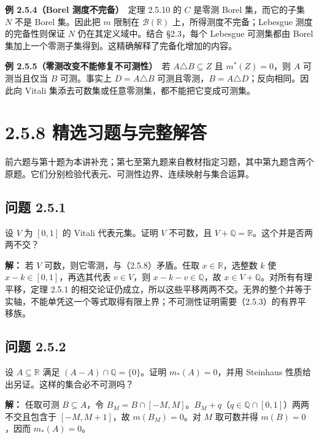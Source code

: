 \documentclass[11pt,a4paper]{article}
\begin{document}
\textbf{例 2.5.4（Borel 测度不完备）}　定理 2.5.10 的 \(C\) 是零测 Borel
集，而它的子集 \(N\) 不是 Borel 集。因此把 \(m\) 限制在
\(\mathcal B(\mathbb R)\) 上，所得测度不完备；Lebesgue
测度的完备性则保证 \(N\) 仍在其定义域中。结合 §2.3，每个 Lebesgue
可测集都由 Borel 集加上一个零测子集得到。这精确解释了完备化增加的内容。

\textbf{例 2.5.5（零测改变不能修复不可测性）}　若
\(A\triangle B\subseteq Z\) 且 \(m^*(Z)=0\)，则 \(A\) 可测当且仅当 \(B\)
可测。事实上 \(D=A\triangle B\)
可测且零测，\(B=A\triangle D\)；反向相同。因此向 Vitali
集添去可数集或任意零测集，都不能把它变成可测集。

\section[\S{}2.5.8
精选习题与完整解答]{2.5.8
精选习题与完整解答}\label{ux7cbeux9009ux4e60ux9898ux4e0eux5b8cux6574ux89e3ux7b54}

前六题与第十题为本讲补充；第七至第九题来自教材指定习题，其中第九题含两个原题。它们分别检验代表元、可测性边界、连续映射与集合运算。

\subsection{问题 2.5.1}\label{ux95eeux9898-2.5.1}

设 \(V\) 为 \([0,1]\) 的 Vitali 代表元集。证明 \(V\) 不可数，且
\(V+\mathbb Q=\mathbb R\)。这个并是否两两不交？

\textbf{解：} 若 \(V\) 可数，则它零测，与（2.5.8）矛盾。任取
\(x\in\mathbb R\)，选整数 \(k\) 使 \(x-k\in[0,1]\)，再选其代表
\(v\in V\)，则 \(x-k-v\in\mathbb Q\)，故
\(x\in V+\mathbb Q\)。对所有有理平移，定理 2.5.1
的相交论证仍成立，所以这些平移两两不交。无界的整个并等于实轴，不能单凭这一个等式取得有限上界；不可测性证明需要（2.5.3）的有界平移族。

\subsection{问题 2.5.2}\label{ux95eeux9898-2.5.2}

设 \(A\subseteq\mathbb R\) 满足 \((A-A)\cap\mathbb Q=\{0\}\)。证明
\(m_*(A)=0\)，并用 Steinhaus 性质给出另证。这样的集合必不可测吗？

\textbf{解：} 任取可测 \(B\subseteq A\)，令
\(B_M=B\cap[-M,M]\)。\(B_M+q\)（\(q\in\mathbb Q\cap[0,1]\)）两两不交且包含于
\([-M,M+1]\)，故 \(m(B_M)=0\)。对 \(M\) 取可数并得 \(m(B)=0\)，因而
\(m_*(A)=0\)。
\end{document}
